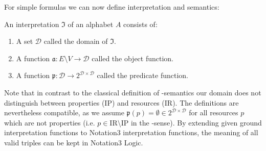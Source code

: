 For simple formulas we can now define interpretation and semantics:

\begin{definition}[Interpretation]
An interpretation $\mathfrak{I}$ of
an alphabet $A$ consists of:
\begin{enumerate}
\item A set $\mathcal{D}$ called the domain of $\mathfrak{I}$.
\item A function $\mathfrak{a}: 
E\setminus V \rightarrow \mathcal{D}$ called the object function.
\item A function $\mathfrak{p}:
\mathcal{D} \rightarrow 2^{\mathcal{D} \times \mathcal{D}}$ called the predicate function.
\end{enumerate}
\end{definition}

Note that in contrast to the classical definition of \rdf-semantics \cite{RDFSemantics} our domain does not distinguish between properties (IP) 
and resources (IR). 
The definitions are nevertheless compatible, as we assume $\mathfrak{p}(p)=\emptyset\in 2^{\mathcal{D} \times \mathcal{D}}$
for all resources $p$ which are not properties (i.e. $p \in \text{IR}\setminus \text{IP}$ in the \rdf-sense). 
By extending given \rdf ground interpretation functions to Notation3 interpretation functions, 
the meaning of all valid \rdf triples can be kept in Notation3 Logic. %
% 






